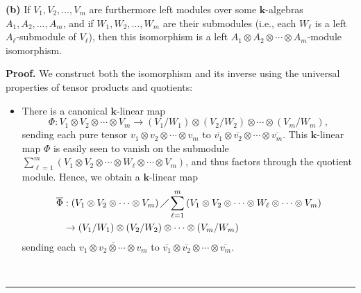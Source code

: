 \documentclass[numbers=enddot,12pt,final,onecolumn,notitlepage]{scrartcl}%
\theoremstyle{definition}
\newenvironment{noncompile}{}{}
\newenvironment{proof}[1][Proof]{\noindent\textbf{#1.} }{\ \rule{0.5em}{0.5em}}
\let\sumnonlimits\sum
\renewcommand{\sum}{\sumnonlimits\limits}
\begin{document}
\begin{noncompile}
\textbf{(b)} If $V_{1},V_{2},\ldots,V_{m}$ are furthermore left modules over
some $\mathbf{k}$-algebras $A_{1},A_{2},\ldots,A_{m}$, and if $W_{1}%
,W_{2},\ldots,W_{m}$ are their submodules (i.e., each $W_{\ell}$ is a left
$A_{\ell}$-submodule of $V_{\ell}$), then this isomorphism is a left
$A_{1}\otimes A_{2}\otimes\cdots\otimes A_{m}$-module isomorphism.
\end{noncompile}

\begin{proof}
We construct both the isomorphism and its inverse using the universal
properties of tensor products and quotients:

\begin{itemize}
\item There is a canonical $\mathbf{k}$-linear map%
\[
\Phi:V_{1}\otimes V_{2}\otimes\cdots\otimes V_{m}\rightarrow\left(
V_{1}/W_{1}\right)  \otimes\left(  V_{2}/W_{2}\right)  \otimes\cdots
\otimes\left(  V_{m}/W_{m}\right)  ,
\]
sending each pure tensor $v_{1}\otimes v_{2}\otimes\cdots\otimes v_{m}$ to
$\overline{v_{1}}\otimes\overline{v_{2}}\otimes\cdots\otimes\overline{v_{m}}$.
This $\mathbf{k}$-linear map $\Phi$ is easily seen to vanish on the submodule
$\sum_{\ell=1}^{m}\left(  V_{1}\otimes V_{2}\otimes\cdots\otimes W_{\ell
}\otimes\cdots\otimes V_{m}\right)  $, and thus factors through the quotient
module. Hence, we obtain a $\mathbf{k}$-linear map%
\begin{align*}
\overline{\Phi}  &  :\left(  V_{1}\otimes V_{2}\otimes\cdots\otimes
V_{m}\right)  \diagup\sum_{\ell=1}^{m}\left(  V_{1}\otimes V_{2}\otimes
\cdots\otimes W_{\ell}\otimes\cdots\otimes V_{m}\right) \\
&  \rightarrow\left(  V_{1}/W_{1}\right)  \otimes\left(  V_{2}/W_{2}\right)
\otimes\cdots\otimes\left(  V_{m}/W_{m}\right)
\end{align*}
sending each $\overline{v_{1}\otimes v_{2}\otimes\cdots\otimes v_{m}}$ to
$\overline{v_{1}}\otimes\overline{v_{2}}\otimes\cdots\otimes\overline{v_{m}}$.


\end{itemize}
\end{proof}
\end{document}

